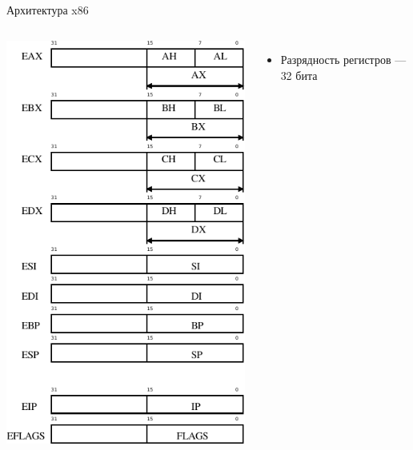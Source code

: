 \documentclass{beamer}
\begin{document}
    \subsection{}
    \begin{frame}{Архитектура x86}
        \begin{columns}
            \includegraphics[width=\linewidth]{fig/x86_regs.pdf}
        \begin{itemize}\footnotesize
            \item Разрядность регистров --- 32 бита

\end{itemize}
\end{columns}
\end{frame}
\end{document}
